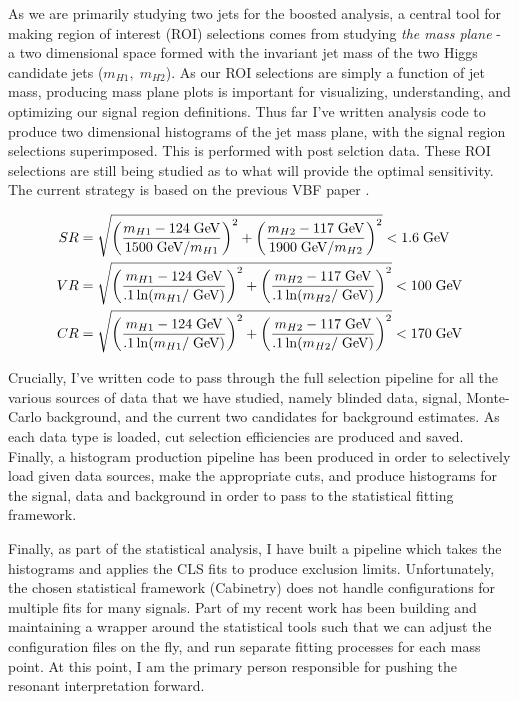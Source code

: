 \documentclass[12pt]{article}
\begin{document}
As we are primarily studying two jets for the boosted analysis, a central tool
for making region of interest (ROI) selections comes from studying \textit{the
mass plane} - a two dimensional space formed with the invariant jet mass of the
two Higgs candidate jets ($m_{H1},\;m_{H2}$). As our ROI selections are simply a
function of jet mass, producing mass plane plots is important for visualizing,
understanding, and optimizing our signal region definitions. Thus far I've
written analysis code to produce two dimensional histograms of the jet mass
plane, with the signal region selections superimposed. This is performed with
post selction data. These ROI selections are still being studied as to what will
provide the optimal sensitivity. The current strategy is based on the previous
VBF paper \cite{atlas_hhbbbb_vbf}.

\begin{align}
    SR &= \sqrt{\left( \frac{m_{H1}-124\;\text{GeV}}{1500\;\text{GeV}/m_{H1}}
    \right)^2 + \left( \frac{m_{H2}-117\;\text{GeV}}{1900\;\text{GeV}/m_{H2}}
    \right)^2} < 1.6 \;\text{GeV} \\
    VR &= \sqrt{\left( \frac{m_{H1}-124\;\text{GeV}}{.1\ln(m_{H1}/\;\text{GeV})}
    \right)^2 + \left( \frac{m_{H2}-117\;\text{GeV}}{.1\ln(m_{H2}/\;\text{GeV})}
    \right)^2} < 100 \;\text{GeV} \\
    CR &= \sqrt{\left( \frac{m_{H1}-124\;\text{GeV}}{.1\ln(m_{H1}/\;\text{GeV})}
    \right)^2 + \left( \frac{m_{H2}-117\;\text{GeV}}{.1\ln(m_{H2}/\;\text{GeV})}
    \right)^2} < 170 \;\text{GeV}
\end{align}

Crucially, I've written code to pass through the full selection pipeline for all
the various sources of data that we have studied, namely blinded data, signal,
Monte-Carlo background, and the current two candidates for background estimates.
As each data type is loaded, cut selection efficiencies are produced and saved.
Finally, a histogram production pipeline has been produced in order to
selectively load given data sources, make the appropriate cuts, and produce
histograms for the signal, data and background in order to pass to the
statistical fitting framework. %

Finally, as part of the statistical analysis, I have built a pipeline which
takes the histograms and applies the CLS fits to produce exclusion limits.
Unfortunately, the chosen statistical framework (Cabinetry) \cite{cabinetry}
does not handle configurations for multiple fits for many signals. Part of my
recent work has been building and maintaining a wrapper around the statistical
tools such that we can adjust the configuration files on the fly, and run
separate fitting processes for each mass point. At this point, I am the primary
person responsible for pushing the resonant interpretation forward.
\end{document}
